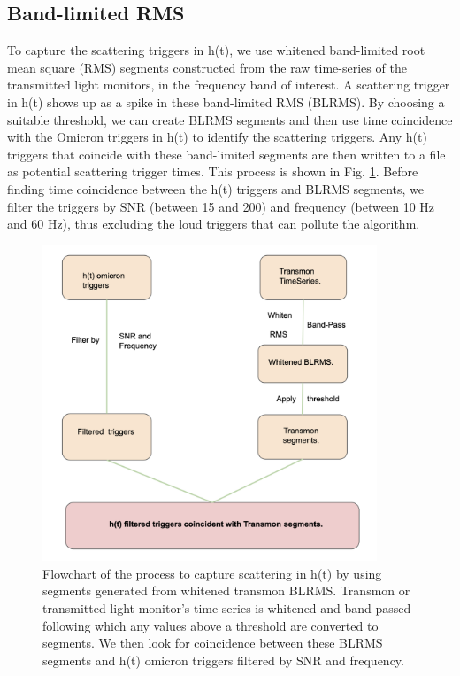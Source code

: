 \documentclass[12pt]{iopart}
\begin{document}
\subsection{Band-limited RMS}
To capture the scattering triggers in h(t), we use whitened band-limited root mean square (RMS) segments constructed from the raw time-series of the transmitted light monitors, in the frequency band of interest. A scattering trigger in h(t) shows up as a spike in these band-limited RMS (BLRMS). By choosing a suitable threshold, we can create BLRMS segments and then use time coincidence with the Omicron triggers in h(t) to identify the scattering triggers. Any h(t) triggers that coincide with these band-limited segments are then written to a file as potential scattering trigger times.  This process is shown in Fig. \ref{fig:flow}. Before finding time coincidence between the h(t) triggers and BLRMS segments, we filter the triggers by SNR (between 15 and 200) and frequency (between 10 Hz and 60 Hz), thus excluding the loud triggers that can pollute the algorithm. 


\quad
\begin{figure}[h]
    \centering
    \includegraphics[width=10cm]{flow.png}
    \caption{Flowchart of the process to capture scattering in h(t) by using segments generated from whitened transmon BLRMS. Transmon or transmitted light monitor's time series is whitened and band-passed following which any values above a threshold are converted to segments. We then look for coincidence between these BLRMS segments and h(t) omicron triggers filtered by SNR and frequency.}
    \label{fig:flow}
\end{figure}
\end{document}
